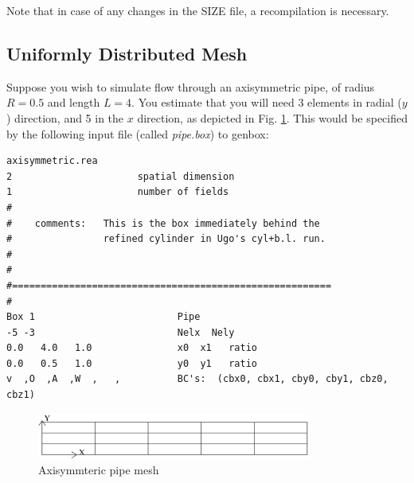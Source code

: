 
Note that in case of any changes in the SIZE file, a recompilation is necessary.\\
\subsection{Uniformly Distributed Mesh}

Suppose you wish to simulate flow through an axisymmetric pipe,
of radius \(R=0.5\) and length \(L=4\).  You estimate that you will
need 3 elements in radial (\(y\)) direction, and 5 in the \(x\) direction,
as depicted in Fig. \ref{fig:mesh_axi1}.
This would be specified by the following input file (called {\em pipe.box})
to genbox:

\begin{verbatim}
axisymmetric.rea
2                      spatial dimension
1                      number of fields
#
#    comments:   This is the box immediately behind the 
#                refined cylinder in Ugo's cyl+b.l. run.
#
#
#========================================================
#
Box 1                         Pipe
-5 -3                         Nelx  Nely
0.0   4.0   1.0               x0  x1   ratio
0.0   0.5   1.0               y0  y1   ratio
v  ,O  ,A  ,W  ,   ,          BC's:  (cbx0, cbx1, cby0, cby1, cbz0, cbz1)
\end{verbatim}
\begin{figure}
\centering
\includegraphics[width=0.8\textwidth]{Figs/mesh_axi1}
\caption{Axisymmteric pipe mesh}
\label{fig:mesh_axi1}
\end{figure}
\noindent
